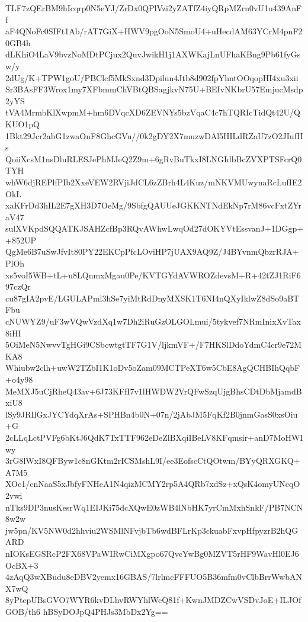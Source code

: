 TLF7zQErBM9hIcqrp0N5eYJ/ZrDx0QPlVzi2yZATfZ4iyQRpMZrn0vU1u439AnFf
aF4QNoFc0SIFt1Ab/rAT7GiX+HWV9pgOoN5SmoU4+uHecdAM63YCrM4pnF20GB4h
dLKhiO4LaV9bvzNoMDtPCjux2QuvJwikH1j1AXWKajLnUFhaKBng9Pb61fyGsw/y
2dUg/K+TPW1goU/PBClcf5MkSxnd3Dpilun4Jtb8d902fpYhntOOqopHI4xu3xii
Sr3BAsFF3Wrox1my7XFbmmChVBtQBSagjkvN75U+BEIvNKbrU57EmjucMsdp2yYS
tVA4MrmbKlXwpmM+hm6DVqcXD6ZEVNYs5bzVqaC4c7hTQRIcTidQt42U/QKUO1pQ
1Bkt29Jcr2abG1zwaOnF8GhcGVu//0k2gDY2X7muzwDAl5HILdRZaU7zO2JIufHs
QoiiXcsM1usDluRLESJePhMJeQ2Z9m+6gRvBuTkxI8LNGIdbBcZVXPTSFcrQ0TYH
whW6djREPlfPIb2XxeVEW2RVjiJdCL6zZBrh4L4Kuz/mNKVMUwynaRcLufIE2OkL
xaKFrDd3hIL2E7gXH3D7OeMg/9SbfgQAUUeJGKKNTNdEkNp7rM86vcFxtZYraV47
sulXVKpdSQQATKJSAHZcfBp3RQvAWhwLwqOd27dOKYVtEssvanJ+1DGgp++852UP
QgMe6B7uSwJfvIt80PY22EKCpPfcLOviHP7jUAX9AQ9Z/J4BYvnmQbzrRJA+PlOh
xs5voI5WB+tL+u8LQnmxMgau0Pe/KVTGYdAVWROZdevsM+R+42tZJ1RiF697czQr
cu87gIA2pvE/LGULAPml3hSe7yiMtRdDnyMXSK1T6NI4nQXyIklwZ8dSo9aBTFbu
cNUWYZ9/uF3wVQwVzdXq1w7Dh2iRuGzOLGOLmui/5tykvef7NRmInixXvTax8iHI
5OiMeN5NwvvTgHGi9CSbcwtgtTF7G1V/ljkmVF+/F7HKSlDdoYdmC4cr9e72MKA8
Whiubw2clh+uwW2TZbI1K1oDv5oZam09MCTPeXT6w5CbE8AgQCHBIhQqbF+o4y98
MeMXJ5uCjRheQ43av+6J73KFfI7v1lHWDW2VrQFwSzqUjgBhsCDtDbMjamdBxiU8
lSy9JRIlGxJYCYdqXrAs+SPHBn4b0N+07n/2jAbJM5FqKf2B0jnmGasS0xsOiu+G
2cLLqLctPVFg6bKtJ6QdK7TxTTF962eDeZlBXqiIBeLV8KFqmsir+anD7MoHWIwy
3rG8lWxI8QFByw1c8nGKtm2rICSMshL9I/ee3EofscCtQOtwm/BYyQRXGKQ+A7M5
XOc1/cnNaaS5xJbfyFNHeA1N4qizMCMY2rp5A4QRb7xdSz+xQsK4omyUNcqO2vwi
nTks9DP3nusKesrWq1EIJKi75dcXQwE0zWB4lNbHK7yrCmMxhSnkF/PB7NCN8w2w
jw5pn/KV5NW0d2hhviu2WSMlNFvjbTb6wdBFLrKp3ckuabFxvpHfpyzrB2hQGARD
nIOKsEGSRcP2FX68VPaWIRwCiMXgpo67QvcYwBg0MZVT5rHF9WavHl0EJ6OcBX+3
4zAqQ3wXBudu8eDBV2yemx16GBAS/7lrlmcFFFUO5B36mfm0vClbBrrWwbANX7wQ
8yPtepUBsGVO7WYR6kvDLhvRWYhlWcQ81f+KwnJMDZCwVSDvJoE+ILJOfGOB/th6
hBSyDOJpQ4PHJs3MbDx2Yg==
